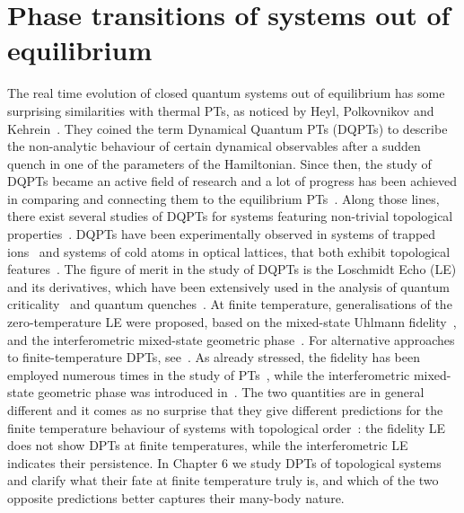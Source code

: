 \section{Phase transitions of systems out of equilibrium }
The real time evolution of closed quantum systems out of equilibrium has some surprising similarities with thermal PTs, as noticed by Heyl, Polkovnikov and Kehrein~\cite{hey:pol:keh:13}. They coined the term Dynamical Quantum PTs (DQPTs) to describe the non-analytic behaviour of certain dynamical observables after a sudden quench in one of the parameters of the Hamiltonian. Since then, the study of DQPTs became an active field of research and a lot of progress has been achieved in comparing and connecting them to the equilibrium PTs~\cite{kar:sch:13,and:sir:14,vaj:dor:14,hey:15,kar:sch:17,hal:zau:17,zau:hal:17,hom:abe:zau:hal:17}. Along those lines, there exist several studies of DQPTs for systems featuring non-trivial topological properties~\cite{vaj:dor:15,sch:keh:15,bud:hey:16,hua:bal:16,jaf:joh:17,sed:flei:sir:17}. DQPTs have been experimentally observed in systems of trapped ions~\cite{jur:etal:17} and systems of cold atoms in optical lattices, that both exhibit topological features~\cite{fla:etal:18}. The figure of merit in the study of DQPTs is the Loschmidt Echo (LE) and its derivatives, which have been extensively used in the analysis of quantum criticality~\cite{qua:son:liu:zan:sun:06,zan:pau:06,zan:qua:wan:sun:07,pol:muk:gre:moo:10,jac:ven:zan:11} and quantum quenches~\cite{ven:zan:10}. At finite temperature, generalisations of the zero-temperature LE were proposed, based on the mixed-state Uhlmann fidelity~\cite{ven:tac:san:san:11,jac:ven:zan:11}, and the interferometric mixed-state geometric phase~\cite{hey:bud:17, bah:ban:dut:17}.
 For alternative approaches to finite-temperature DPTs, see~\cite{lan:fra:hal:17,hal:zau:mcc:veg:sch:kas:17}. 
 As already stressed, the fidelity has been employed numerous times in the study of PTs~\cite{zan:pau:06,pau:sac:nog:vie:dug,zan:ven:gio:07,aba:ham:zan:08,zha:zho:09}, while the interferometric mixed-state geometric phase was introduced in~\cite{sjo:pat:eke:ana:eri:oi:ved:00}. The two quantities are in general different and it comes as no surprise that they give different predictions for the finite temperature behaviour of systems with topological order~\cite{bah:ban:dut:17}: the fidelity LE does not show DPTs at finite temperatures, while the interferometric LE indicates their persistence. In Chapter 6 we study DPTs of topological systems and clarify what their fate at finite temperature truly is, and which of the two opposite predictions better captures their many-body nature. 


